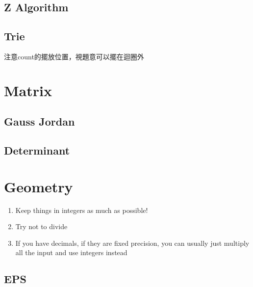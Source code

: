 \documentclass[10pt,oneside]{article}
\begin{document}
\begin{landscape}
\begin{multicols}{2}

\subsection{Z Algorithm}


\subsection{Trie}
注意count的擺放位置，視題意可以擺在迴圈外

\section{Matrix}

\subsection{Gauss Jordan}

\subsection{Determinant}



\section{Geometry}

\begin{enumerate}
	\item Keep things in integers as much as possible!
	\item Try not to divide
	\item If you have decimals, if they are fixed precision, you can usually just multiply all the input and use integers instead
\end{enumerate}

\subsection{EPS}



\end{multicols}
\end{landscape}
\end{document}

